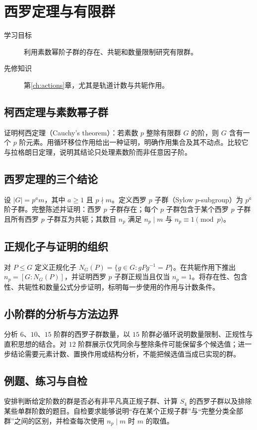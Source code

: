 \documentclass[UTF8,12pt,a4paper,fontset=fandol]{ctexbook}
\begin{document}
\chapter{西罗定理与有限群}\label{ch:sylow}

\begin{description}
  \item[学习目标] 利用素数幂阶子群的存在、共轭和数量限制研究有限群。
  \item[先修知识] 第\ref{ch:actions}章，尤其是轨道计数与共轭作用。
\end{description}

\section{柯西定理与素数幂子群}
证明柯西定理（Cauchy's theorem）：若素数 $p$ 整除有限群 $G$ 的阶，则 $G$ 含有一个 $p$ 阶元素。用循环移位作用给出一种证明，明确作用集合及其不动点。比较它与拉格朗日定理，说明其结论只处理素数阶而非任意因子阶。

\section{西罗定理的三个结论}
设 $|G|=p^a m$，其中 $a\geq1$ 且 $p\nmid m$。定义西罗 $p$ 子群（Sylow $p$-subgroup）为 $p^a$ 阶子群。完整陈述并证明：西罗 $p$ 子群存在；每个 $p$ 子群包含于某个西罗 $p$ 子群且所有西罗 $p$ 子群互为共轭；其数目 $n_p$ 满足 $n_p\mid m$ 与 $n_p\equiv1\pmod p$。

\section{正规化子与证明的组织}
对 $P\leq G$ 定义正规化子 $N_G(P)=\{g\in G:gPg^{-1}=P\}$。在共轭作用下推出 $n_p=[G:N_G(P)]$，并证明西罗 $p$ 子群正规当且仅当 $n_p=1$。将存在性、包含性、共轭性和数量公式分步证明，标明每一步使用的作用与计数条件。

\section{小阶群的分析与方法边界}
分析 $6$、$10$、$15$ 阶群的西罗子群数量，以 $15$ 阶群必循环说明数量限制、正规性与直积思想的结合。对 $12$ 阶群展示仅凭同余与整除条件可能保留多个候选值；进一步结论需要元素计数、置换作用或结构分析，不能把候选值当成已实现的群。

\section{例题、练习与自检}
安排判断给定阶数的群是否必有非平凡真正规子群、计算 $S_4$ 的西罗子群以及排除某些单群阶数的题目。自检要求能够说明“存在某个正规子群”与“完整分类全部群”之间的区别，并检查每次使用 $n_p\mid m$ 时 $m$ 的取值。
\end{document}
